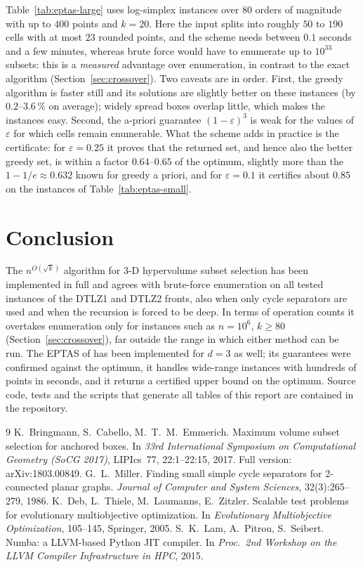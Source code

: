 \documentclass[12pt,a4paper]{article}
\begin{document}
Table~\ref{tab:eptas-large} uses log-simplex instances over $80$ orders of magnitude with up to $400$ points and
$k=20$.  Here the input splits into roughly $50$ to $190$ cells with at most $23$ rounded points, and the scheme needs between
$0.1$ seconds and a few minutes, whereas brute force would have to enumerate up to $10^{33}$ subsets: this is a
\emph{measured} advantage over enumeration, in contrast to the exact algorithm (Section~\ref{sec:crossover}).  Two
caveats are in order.  First, the greedy algorithm is faster still and its solutions are slightly better on these
instances (by $0.2$--$3.6\,\%$ on average); widely spread boxes overlap little, which makes the instances easy.  Second, the
a-priori guarantee $(1-\varepsilon)^3$ is weak for the values of $\varepsilon$ for which cells remain enumerable.  What
the scheme adds in practice is the certificate: for $\varepsilon=0.25$ it proves that the returned set, and hence also the better
greedy set, is within a factor $0.64$--$0.65$ of the optimum, slightly more than the $1-1/e\approx0.632$ known for greedy
a priori, and for $\varepsilon=0.1$ it certifies about $0.85$ on the instances of Table~\ref{tab:eptas-small}.

\section{Conclusion}
The $n^{O(\sqrt{k})}$ algorithm for 3-D hypervolume subset selection has been implemented in full and
agrees with brute-force enumeration on all tested instances of the DTLZ1 and DTLZ2 fronts, also when only
cycle separators are used and when the recursion is forced to be deep.  In terms of operation counts it overtakes enumeration only for instances such as $n=10^6$,
$k\ge 80$ (Section~\ref{sec:crossover}), far outside the range in which either method can be run.  The EPTAS of
\cite[Section~5]{BCE} has been implemented for $d=3$ as well; its guarantees were confirmed against the optimum, it
handles wide-range instances with hundreds of points in seconds, and it returns a certified upper bound on the
optimum.  Source code, tests and the scripts that generate all tables of this report are contained in the repository.

\begin{thebibliography}{9}
 K.~Bringmann, S.~Cabello, M.~T.~M.~Emmerich.
  Maximum volume subset selection for anchored boxes.
  In \emph{33rd International Symposium on Computational Geometry (SoCG 2017)}, LIPIcs~77, 22:1--22:15, 2017.
  Full version: arXiv:1803.00849.
 G.~L.~Miller.
  Finding small simple cycle separators for 2-connected planar graphs.
  \emph{Journal of Computer and System Sciences}, 32(3):265--279, 1986.
 K.~Deb, L.~Thiele, M.~Laumanns, E.~Zitzler.
  Scalable test problems for evolutionary multiobjective optimization.
  In \emph{Evolutionary Multiobjective Optimization}, 105--145, Springer, 2005.
 S.~K.~Lam, A.~Pitrou, S.~Seibert.
  Numba: a LLVM-based Python JIT compiler.
  In \emph{Proc.\ 2nd Workshop on the LLVM Compiler Infrastructure in HPC}, 2015.
\end{thebibliography}
\end{document}

